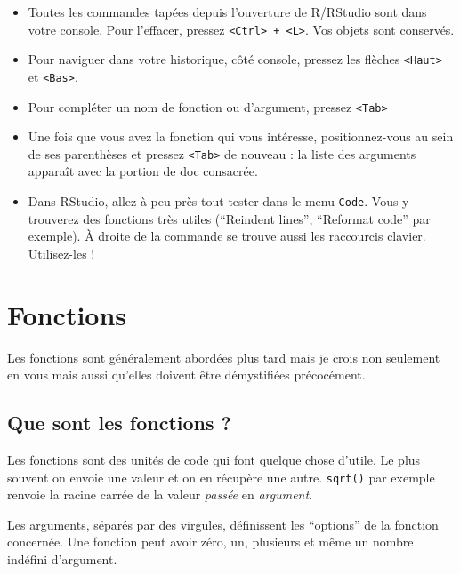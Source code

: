 \documentclass[
  letterpaper,
  DIV=11,
  numbers=noendperiod]{scrreprt}
\providecommand{\tightlist}{%
  \setlength{\itemsep}{0pt}\setlength{\parskip}{0pt}}\usepackage{longtable,booktabs,array}
\begin{document}
\begin{itemize}
\tightlist
\item
  Toutes les commandes tapées depuis l'ouverture de R/RStudio sont dans
  votre console. Pour l'effacer, pressez
  \texttt{\textless{}Ctrl\textgreater{}\ +\ \textless{}L\textgreater{}}.
  Vos objets sont conservés.
\item
  Pour naviguer dans votre historique, côté console, pressez les flèches
  \texttt{\textless{}Haut\textgreater{}} et
  \texttt{\textless{}Bas\textgreater{}}.
\item
  Pour compléter un nom de fonction ou d'argument, pressez
  \texttt{\textless{}Tab\textgreater{}}
\item
  Une fois que vous avez la fonction qui vous intéresse,
  positionnez-vous au sein de ses parenthèses et pressez
  \texttt{\textless{}Tab\textgreater{}} de nouveau : la liste des
  arguments apparaît avec la portion de doc consacrée.
\item
  Dans RStudio, allez à peu près tout tester dans le menu \texttt{Code}.
  Vous y trouverez des fonctions très utiles (``Reindent lines'',
  ``Reformat code'' par exemple). À droite de la commande se trouve
  aussi les raccourcis clavier. Utilisez-les !
\end{itemize}

\hypertarget{fonctions}{%
\section{Fonctions}\label{fonctions}}

Les fonctions sont généralement abordées plus tard mais je crois non
seulement en vous mais aussi qu'elles doivent être démystifiées
précocément.

\hypertarget{que-sont-les-fonctions}{%
\subsection{Que sont les fonctions ?}\label{que-sont-les-fonctions}}

Les fonctions sont des unités de code qui font quelque chose d'utile. Le
plus souvent on envoie une valeur et on en récupère une autre.
\texttt{sqrt()} par exemple renvoie la racine carrée de la valeur
\emph{passée} en \emph{argument}.

Les arguments, séparés par des virgules, définissent les ``options'' de
la fonction concernée. Une fonction peut avoir zéro, un, plusieurs et
même un nombre indéfini d'argument.
\end{document}
